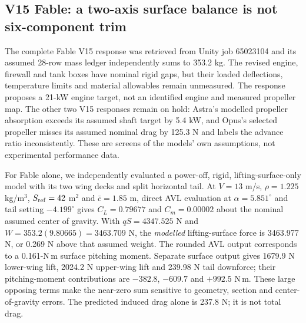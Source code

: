 \subsection{V15 Fable: a two-axis surface balance is not six-component trim}
\label{sec:v15-fable-gate}

The complete Fable V15 response was retrieved from Unity job 65023104 and
its assumed 28-row mass ledger independently sums to 353.2 kg. The revised
engine, firewall and tank boxes have nominal rigid gaps, but their loaded
deflections, temperature limits and material allowables remain unmeasured.
The response proposes a 21-kW engine target, not an identified engine and
measured propeller map. The other two V15 responses remain on hold: Astra's
modelled propeller absorption exceeds its assumed shaft target by 5.4 kW,
and Opus's selected propeller misses its assumed nominal drag by 125.3 N
and labels the advance ratio inconsistently. These are screens of the
models' own assumptions, not experimental performance data.

For Fable alone, we independently evaluated a power-off, rigid,
lifting-surface-only model with its two wing decks and split horizontal
tail. At $V=13$ m/s, $\rho=1.225$ kg/m$^3$, $S_{\rm ref}=42$ m$^2$ and
$\bar c=1.85$ m, direct AVL evaluation at $\alpha=5.851^\circ$ and tail
setting $-4.199^\circ$ gives $C_L=0.79677$ and $C_m=0.00002$ about the
nominal assumed center of gravity. With $qS=4347.525$ N and
$W=353.2(9.80665)=3463.709$ N, the \emph{modelled} lifting-surface force is
3463.977 N, or 0.269 N above that assumed weight. The rounded AVL output
corresponds to a 0.161-N\,m surface pitching moment. Separate surface
output gives 1679.9 N lower-wing lift, 2024.2 N upper-wing lift and
239.98 N tail downforce; their pitching-moment contributions are
$-382.8$, $-609.7$ and $+992.5$ N\,m. These large opposing terms make
the near-zero sum sensitive to geometry, section and center-of-gravity
errors. The predicted induced drag alone is 237.8 N; it is not total drag.

